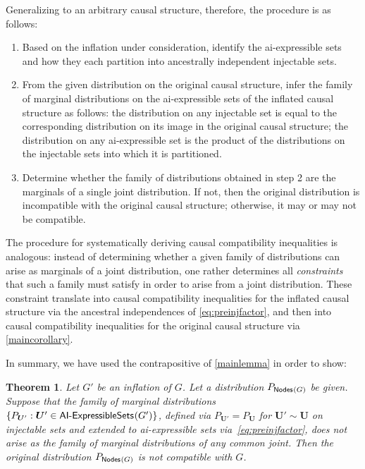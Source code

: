 \documentclass[aps,english,10pt,superscriptaddress,onecolumn,twoside,longbibliography,pra,floatfix,fleqn,nofootinbib]{revtex4-1}
\newtheorem{theorem}{Theorem}
\theoremstyle{definition}
\newcommand{\SmallNamedFunction}[3][]{\operatorname{\mathsf{#2}}_{#1}\parenths{#3}}
\newcommand{\nodes}[1]{\SmallNamedFunction{Nodes}{#1}}
\DeclarePairedDelimiter{\parenths}{\lparen}{\rparen}
\newcommand{\tob}[1]{\textcolor{RawSienna}{#1}}
\begin{document}
Generalizing to an arbitrary causal structure, therefore, the procedure is as follows:
\begin{enumerate}
\item Based on the inflation under consideration, identify the ai-expressible sets and how they each partition into ancestrally independent injectable sets.
\item From the given distribution on the original causal structure, infer the family of marginal distributions on the ai-expressible sets of the inflated causal structure as follows: the distribution on any injectable set is equal to the corresponding distribution on its image in the original causal structure; the distribution on any ai-expressible set is the product of the distributions on the injectable sets into which it is partitioned.
\item Determine whether the family of distributions obtained in step 2 are the marginals of a single joint distribution. If not, then the original distribution is incompatible with the original causal structure; otherwise, it may or may not be compatible.
\end{enumerate}

The procedure for systematically deriving causal compatibility inequalities is analogous: instead of determining whether a given family of distributions can arise as marginals of a joint distribution, one rather determines all \emph{constraints} that such a family must satisfy in order to arise from a joint distribution. These constraint translate into causal compatibility inequalities for the inflated causal structure via the ancestral independences of \cref{eq:preinjfactor}, and then into causal compatibility inequalities for the original causal structure via \cref{maincorollary}.

\tob{In summary, we have used the contrapositive of \cref{mainlemma} in order to show:}

\begin{theorem}
\tob{Let $G'$ be an inflation of $G$. Let a distribution $P_{\nodes{G}}$ be given. Suppose that the family of marginal distributions $\{ P_{\bm{U}'} : \bm{U}' \in \SmallNamedFunction{AI-ExpressibleSets}{G'} \}$, defined via $P_{\bm{U}'}= P_{\bm{U}}$ for $\bm{U}' \sim \bm{U}$ on injectable sets and extended to ai-expressible sets via~\cref{eq:preinjfactor}, does not arise as the family of marginal distributions of any common joint. Then the original distribution $P_{\nodes{G}}$ is not compatible with $G$.}
\end{theorem}
\end{document}
